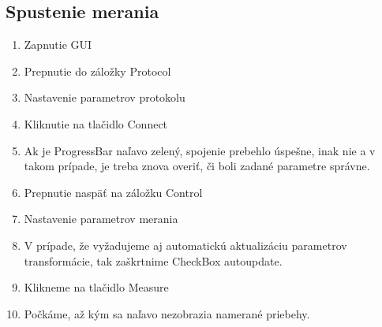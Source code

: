 \documentclass[main.tex]{subfiles}
\begin{document}
		\begin{multicols}{2}
			\subsection{Spustenie merania}
			\begin{enumerate}
				\item Zapnutie GUI
				\item Prepnutie do záložky Protocol
				\item Nastavenie parametrov protokolu 
				\item Kliknutie na tlačidlo Connect
				\item Ak je ProgressBar naľavo zelený, spojenie prebehlo úspešne, inak nie a v takom prípade, je treba znova overiť, či boli zadané parametre správne.
				\item Prepnutie naspäť na záložku Control
				\item Nastavenie parametrov merania
				\item V prípade, že vyžadujeme aj automatickú aktualizáciu parametrov transformácie, tak zaškrtnime CheckBox autoupdate.
				\item Klikneme na tlačidlo Measure
				\item Počkáme, až kým sa naľavo nezobrazia namerané priebehy.
			\end{enumerate}
		\end{multicols}
\end{document}
